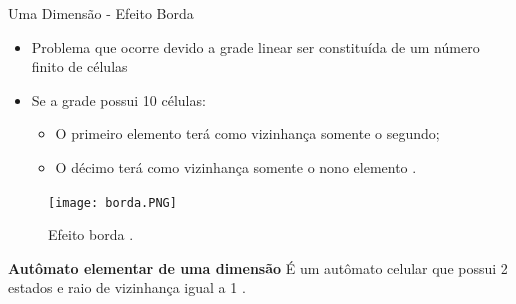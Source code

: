 \documentclass[compress, hide notes]{beamer}
\begin{document}
\begin{frame}{Uma Dimensão - Efeito Borda}
	
	\begin{itemize}
        \setlength\itemsep{12pt}
		\item Problema que ocorre devido a grade linear ser constituída de um número finito de células 
        \item Se a grade possui 10 células:
        \begin{itemize}
        \setlength\itemsep{6pt}
        	\item O primeiro elemento terá como vizinhança somente o segundo;
            \item O décimo terá como vizinhança somente o nono elemento \cite{UFES}.
        \end{itemize}
	\end{itemize}
		
		\begin{figure}[h]
								
			\center
													
			\texttt{[image: borda.PNG]}
			\caption{Efeito borda \cite{UFES}.}
									
		\end{figure} 
        
	\begin{block}{\textbf{Autômato elementar de uma dimensão}} 
    	É um autômato celular que possui 2 estados e raio de vizinhança igual a 1 \cite{ufmg}.
		
	\end{block}
\end{frame}
\end{document}
